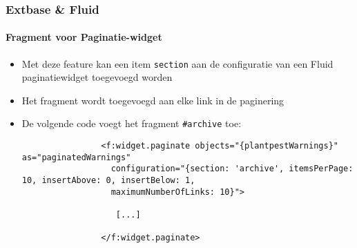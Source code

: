 \begin{frame}[fragile]
	\frametitle{Extbase \& Fluid}
	\framesubtitle{Fragment voor Paginatie-widget}

	\lstset{basicstyle=\tiny\ttfamily}

	\begin{itemize}

		\item Met deze feature kan een item \texttt{section} aan de configuratie van een Fluid paginatiewidget toegevoegd worden

		\item Het fragment wordt toegevoegd aan elke link in de paginering

		\item De volgende code voegt het fragment \texttt{\#archive} toe:

			\begin{lstlisting}
				<f:widget.paginate objects="{plantpestWarnings}" as="paginatedWarnings"
				  configuration="{section: 'archive', itemsPerPage: 10, insertAbove: 0, insertBelow: 1,
				  maximumNumberOfLinks: 10}">

				   [...]

				</f:widget.paginate>
			\end{lstlisting}

	\end{itemize}

\end{frame}


